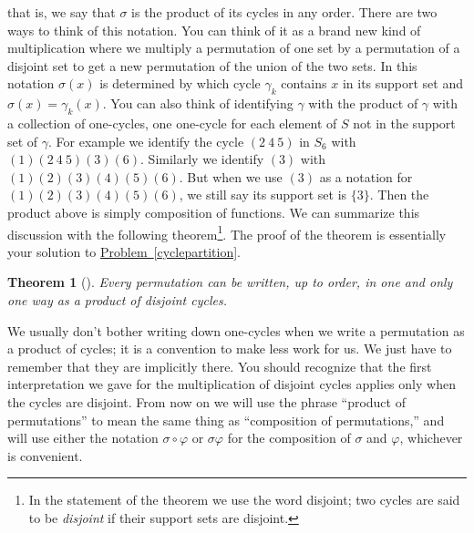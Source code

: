 \documentclass[10pt,]{book}
\theoremstyle{plain}
\newtheorem{theorem}{Theorem}[section]
\theoremstyle{definition}
\numberwithin{equation}{chapter}
\begin{document}
that is, we say that \(\sigma\) is the product of its cycles in any order. There are two ways to think of this notation. You can think of it as a brand new kind of multiplication where we multiply a permutation of one set by a permutation of a disjoint set to get a new permutation of the union of the two sets. In this notation \(\sigma(x)\) is determined by which cycle \(\gamma_k\) contains \(x\) in its support set and \(\sigma(x) =
\gamma_k(x)\). You can also think of identifying \(\gamma\) with the product of \(\gamma\) with a collection of one-cycles, one one-cycle for each element of \(S\) not in the support set of \(\gamma\). For example we identify the cycle \((2\  4\ 5)\) in \(S_6\) with \((1)(2\  4\ 5)(3)(6)\). Similarly we identify \((3)\) with \((1)(2)(3)(4)(5)(6)\). But when we use \((3)\) as a notation for \((1)(2)(3)(4)(5)(6)\), we still say its support set is \(\{3\}\). Then the product above is simply composition of functions. We can summarize this discussion with the following theorem\footnote{In the statement of the theorem we use the word disjoint; two cycles are said to be \emph{disjoint} if their support sets are disjoint.\label{fn-21}}. The proof of the theorem is essentially your solution to \hyperref[cyclepartition]{Problem~\ref{cyclepartition}}.%
\begin{theorem}[{}]\label{theorem-7}
Every permutation can be written, up to order, in one and only one way as a product of disjoint cycles.%
\end{theorem}
We usually don't bother writing down one-cycles when we write a permutation as a product of cycles; it is a convention to make less work for us. We just have to remember that they are implicitly there. You should recognize that the first interpretation we gave for the multiplication of disjoint cycles applies only when the cycles are disjoint. From now on we will use the phrase ``product of permutations'' to mean the same thing as ``composition of permutations,'' and will use either the notation \(\sigma\circ\varphi\) or \(\sigma\varphi\) for the composition of \(\sigma\) and \(\varphi\), whichever is convenient.%
\end{document}
